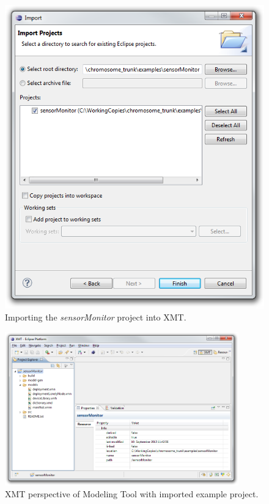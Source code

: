 \begin{figure}[htpb]
	\centering
	\includegraphics[scale=0.5]{figures/xme_import_sensorMonitor.png}
	\caption{Importing the \emph{sensorMonitor} project into XMT.}
	\label{fig:xmt_import_sensorMonitor}
\end{figure}

\begin{figure}[htpb]
	\centering
	\includegraphics[width=0.9\textwidth]{figures/xmt_project_sensorMonitor.png}
	\caption{XMT perspective of \xme Modeling Tool with imported example project.}
	\label{fig:xmt_project_sensorMonitor}
\end{figure}

